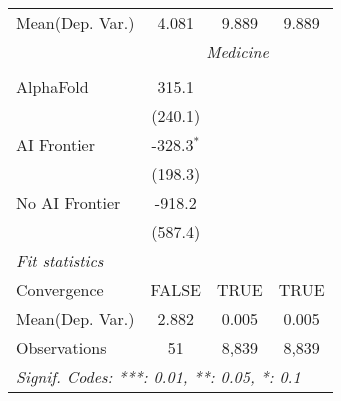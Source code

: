 \begin{tabular}{lccc}
Mean(Dep. Var.) & 4.081 & 9.889 & 9.889 \\
 & \multicolumn{3}{c}{\textit{Medicine}} \\ \\
   AlphaFold      & 315.1        &       &   \\   
                  & (240.1)      &       &   \\   
   AI Frontier    & -328.3$^{*}$ &       &   \\   
                  & (198.3)      &       &   \\   
   No AI Frontier & -918.2       &       &   \\   
                  & (587.4)      &       &   \\   
   \midrule
   \emph{Fit statistics}\\
   Convergence    &FALSE         & TRUE  & TRUE\\  
Mean(Dep. Var.) & 2.882 & 0.005 & 0.005 \\
   Observations   & 51           & 8,839 & 8,839\\  
   \midrule \midrule
   \multicolumn{4}{l}{\emph{Signif. Codes: ***: 0.01, **: 0.05, *: 0.1}}\\
\end{tabular}
\par\endgroup

